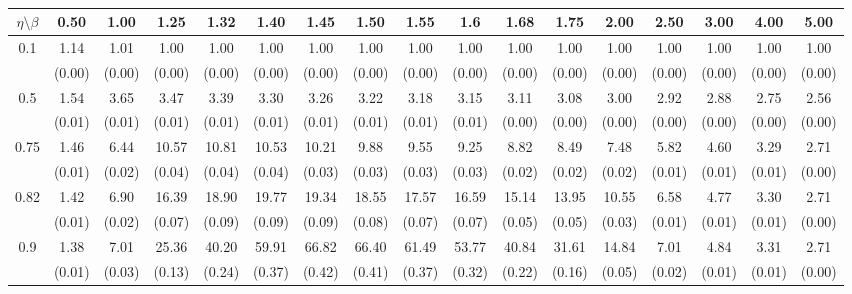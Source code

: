\documentclass[12pt]{article}  %
\theoremstyle{plain}
\begin{document}
\begin{sidewaystable}[htbp]
\centering
{}
\label{ATS_10-5}
\ \\
\begin{tabular}{ccccccccccccccccc}
\hline
$\eta \setminus \beta $        & 0.50   & 1.00   & 1.25   & 1.32   & 1.40   & 1.45   & 1.50   & 1.55   & 1.6   & 1.68   & 1.75   & 2.00   & 2.50   & 3.00   & 4.00  &5.00 \\ \hline
\multirow{2}{*}{0.1}  & 1.14& 1.01 & 1.00 & 1.00 &  1.00 &  1.00  & 1.00 &  1.00  & 1.00  & 1.00 & 1.00 & 1.00 & 1.00 & 1.00 & 1.00 & 1.00 \\
                      & (0.00) & (0.00) & (0.00) & (0.00) & (0.00) & (0.00) & (0.00) & (0.00) & (0.00) & (0.00) & (0.00) & (0.00) & (0.00) & (0.00) & (0.00) & (0.00)\\ \hline
\multirow{2}{*}{0.5}  & 1.54 &3.65 & 3.47 & 3.39  & 3.30  & 3.26  & 3.22 &  3.18  & 3.15 &  3.11 & 3.08  &3.00 & 2.92 & 2.88 & 2.75&  2.56 \\
                      & (0.01) & (0.01) & (0.01) & (0.01) & (0.01) & (0.01) & (0.01) & (0.01) & (0.01) & (0.00) & (0.00) & (0.00)  & (0.00) & (0.00) & (0.00)&(0.00)\\ \hline
\multirow{2}{*}{0.75}  & 1.46 &6.44& 10.57& 10.81 & 10.53 & 10.21   &9.88  & 9.55  & 9.25  & 8.82 & 8.49 & 7.48&  5.82&  4.60 & 3.29 & 2.71\\
                      & (0.01)& (0.02)& (0.04)& (0.04)& (0.04)& (0.03)& (0.03)& (0.03)& (0.03)& (0.02)&  (0.02)&  (0.02)&  (0.01)&  (0.01)&  (0.01) &   (0.00)\\ \hline
\multirow{2}{*}{0.82}  & 1.42& 6.90& 16.39 &18.90 & 19.77 & 19.34 & 18.55&  17.57 & 16.59 & 15.14 &13.95 &10.55 & 6.58 & 4.77 & 3.30&  2.71\\
                      & (0.01)& (0.02)& (0.07)& (0.09)& (0.09)& (0.09)& (0.08)& (0.07)& (0.07)&  (0.05)&  (0.05)&  (0.03)&  (0.01)&  (0.01)&  (0.01)&   (0.00)\\ \hline
\multirow{2}{*}{0.9}  & 1.38& 7.01 &25.36 &40.20 & 59.91 & 66.82  &66.40&  61.49  &53.77 & 40.84 &31.61 &14.84 & 7.01 & 4.84 & 3.31  &2.71\\
                      & (0.01)& (0.03)& (0.13)& (0.24)& (0.37)& (0.42)& (0.41)& (0.37)& (0.32)&  (0.22)&  (0.16)&  (0.05)&  (0.02)&  (0.01)&  (0.01)&   (0.00)\\ \hline                                               

\end{tabular}
\end{sidewaystable}
\end{document}
